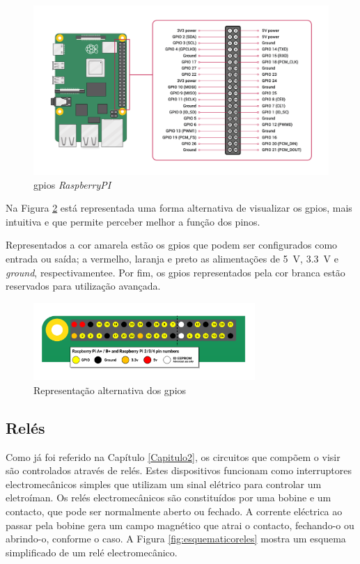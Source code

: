 \begin{figure}[hbtp]
	\centering
	\includegraphics[width=1\textwidth]{figures/GPIO-Pinout-Diagram-2.png}
	\caption{\acrshort{gpio}s \textit{RaspberryPI} \cite{Raspberrytech}}
	\label{fig:gpio}
\end{figure}

Na Figura \ref{fig:gpiocores} está representada uma forma alternativa de visualizar os \acrshort{gpio}s, mais intuitiva e que permite perceber melhor a função dos pinos.

Representados a cor amarela estão os \acrshort{gpio}s que podem ser configurados como entrada ou saída; a vermelho, laranja e preto as alimentações de \SI{5}{\volt}, \SI{3.3}{\volt} e \textit{ground}, respectivamentee. Por fim, os \acrshort{gpio}s representados pela cor branca estão reservados para utilização avançada.

\begin{figure}[hbtp]
	\centering
	\includegraphics[width=0.75\textwidth]{figures/GPIO.png}
	\caption{Representação alternativa dos \acrshort{gpio}s \cite{Raspberrytech}}
	\label{fig:gpiocores}
\end{figure}

\subsection{Relés}
\label{sec:reles}
Como já foi referido na Capítulo \ref{Capitulo2}, os circuitos que compõem o \acrshort{visir} são controlados através de relés. Estes dispositivos funcionam como interruptores electromecânicos simples que utilizam um sinal elétrico para controlar um eletroíman.
Os relés electromecânicos são constituídos por uma bobine e um contacto, que pode ser normalmente aberto ou fechado. A corrente eléctrica ao passar pela bobine gera um campo magnético que atrai o contacto, fechando-o ou abrindo-o, conforme o caso. A Figura \ref{fig:esquematicoreles} mostra um esquema simplificado de um relé electromecânico.


